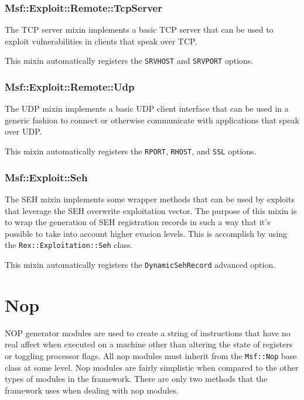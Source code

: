 \documentclass{report}
\begin{document}
            \subsubsection{Msf::Exploit::Remote::TcpServer}

\par
The TCP server mixin implements a basic TCP server that can be used
to exploit vulnerabilities in clients that speak over TCP.

\par
This mixin automatically registers the \texttt{SRVHOST} and
\texttt{SRVPORT} options.

            \subsubsection{Msf::Exploit::Remote::Udp}

\par
The UDP mixin implements a basic UDP client interface that can be
used in a generic fashion to connect or otherwise communicate with
applications that speak over UDP.

\par
This mixin automatically registers the \texttt{RPORT},
\texttt{RHOST}, and \texttt{SSL} options.

            \subsubsection{Msf::Exploit::Seh}

\par
The SEH mixin implements some wrapper methods that can be used by
exploits that leverage the SEH overwrite exploitation vector.  The
purpose of this mixin is to wrap the generation of SEH registration
records in such a way that it's possible to take into account higher
evasion levels.  This is accomplish by using the
\texttt{Rex::Exploitation::Seh} class.

\par
This mixin automatically registers the \texttt{DynamicSehRecord}
advanced option.

    \section{Nop}

\par
NOP generator modules are used to create a string of instructions
that have no real affect when executed on a machine other than
altering the state of registers or toggling processor flags.  All
nop modules must inherit from the \texttt{Msf::Nop} base class at
some level.  Nop modules are fairly simplistic when compared to the
other types of modules in the framework.  There are only two methods
that the framework uses when dealing with nop modules.
\end{document}
